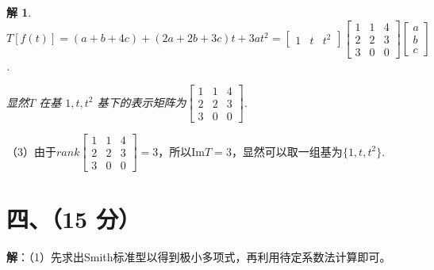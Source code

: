 \documentclass[11pt, a4paper]{article}
\newtheorem{solve}{解}
\begin{document}
\begin{solve}
$T[f(t)] = (a + b + 4c) + (2a + 2b + 3c)t + 3at^2=\begin{bmatrix}1&t&t^2\end{bmatrix}\begin{bmatrix}1&1&4\\2&2&3\\3&0&0\end{bmatrix}\begin{bmatrix}a\\b\\c\end{bmatrix}$.

显然$T$ 在基 $1, t, t^2$ 基下的表示矩阵为$\begin{bmatrix}1&1&4\\2&2&3\\3&0&0\end{bmatrix}$.\\
\end{solve}


（3）由于$rank\begin{bmatrix}1&1&4\\2&2&3\\3&0&0\end{bmatrix}=3$，所以Im$T=3$，显然可以取一组基为$\{1, t, t^2\}$.



\section*{四、（15 分）}
\textbf{解}：（1）先求出Smith标准型以得到极小多项式，再利用待定系数法计算即可。\\
\end{document}
